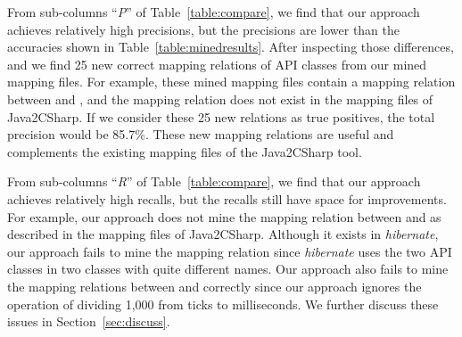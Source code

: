 From sub-columns ``\emph{P}'' of Table~\ref{table:compare}, we find
that our approach achieves relatively high precisions, but the
precisions are lower than the accuracies shown in
Table~\ref{table:minedresults}. After inspecting those differences,
and we find 25 new correct mapping relations of API classes from our
mined mapping files. For example, these mined mapping files contain
a mapping relation between  and
, and the mapping relation does not
exist in the mapping files of Java2CSharp. If we consider these 25 new relations as true positives,
the total precision would be 85.7\%. These new mapping relations are useful and
complements the existing mapping files of the Java2CSharp tool.

From sub-columns ``\emph{R}'' of Table~\ref{table:compare}, we find
that our approach achieves relatively high recalls, but the recalls
still have space for improvements. For example, our approach does
not mine the mapping relation between
 and  as described in the mapping files of
Java2CSharp. Although it exists in \emph{hibernate}, our approach
fails to mine the mapping relation since \emph{hibernate} uses the
two API classes in two classes with quite different names. Our
approach also fails to mine the mapping relations between
 and 
correctly since our approach ignores the operation of dividing 1,000
from ticks to milliseconds. We further discuss these issues in
Section~\ref{sec:discuss}.

